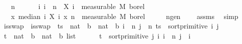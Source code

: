 \begin{isabellebody}
\ \ \ {\isachardoublequoteopen}n\ {\isasymge}\ {}{\isachardoublequoteclose}\ \isanewline
\ \ \ {\isachardoublequoteopen}{\isasymAnd}i{\isachardot}{\kern0pt}\ i\ {\isacharless}{\kern0pt}\ n\ {\isasymLongrightarrow}\ X\ i\ {\isasymin}\ measurable\ M\ borel{\isachardoublequoteclose}\isanewline
\ \ \ {\isachardoublequoteopen}{\isacharparenleft}{\kern0pt}{\isasymlambda}x{\isachardot}{\kern0pt}\ median\ {\isacharparenleft}{\kern0pt}{\isasymlambda}i{\isachardot}{\kern0pt}\ X\ i\ x{\isacharparenright}{\kern0pt}\ n{\isacharparenright}{\kern0pt}\ {\isasymin}\ measurable\ M\ borel{\isachardoublequoteclose}\isanewline
%
\isadelimproof
%
\endisadelimproof
%
\isatagproof
{}\isamarkupfalse%
\ {\isacharminus}{\kern0pt}\isanewline
\ \ \isamarkupfalse%
\ n{\isacharunderscore}{\kern0pt}ge{\isacharunderscore}{\kern0pt}{}{\isacharcolon}{\kern0pt}{\isachardoublequoteopen}n\ {\isachargreater}{\kern0pt}\ {}{\isachardoublequoteclose}\ \isamarkupfalse%
\ assms\ \isamarkupfalse%
\ simp\isanewline
\ \ \isamarkupfalse%
\ is{\isacharunderscore}{\kern0pt}swap\ \ {\isachardoublequoteopen}is{\isacharunderscore}{\kern0pt}swap\ {\isacharequal}{\kern0pt}\ {\isacharparenleft}{\kern0pt}{\isasymlambda}{\isacharparenleft}{\kern0pt}ts\ {\isacharcolon}{\kern0pt}{\isacharcolon}{\kern0pt}\ {\isacharparenleft}{\kern0pt}{\isacharparenleft}{\kern0pt}nat\ {\isasymRightarrow}\ {\isacharprime}{\kern0pt}b{\isacharparenright}{\kern0pt}\ {\isasymRightarrow}\ nat\ {\isasymRightarrow}\ {\isacharprime}{\kern0pt}b{\isacharparenright}{\kern0pt}{\isacharparenright}{\kern0pt}{\isachardot}{\kern0pt}\ {\isasymexists}i\ {\isacharless}{\kern0pt}\ n{\isachardot}{\kern0pt}\ {\isasymexists}j\ {\isacharless}{\kern0pt}\ n{\isachardot}{\kern0pt}\ ts\ {\isacharequal}{\kern0pt}\ sort{\isacharunderscore}{\kern0pt}primitive\ i\ j{\isacharparenright}{\kern0pt}{\isachardoublequoteclose}\isanewline
\ \ \isamarkupfalse%
\ t\ {\isacharcolon}{\kern0pt}{\isacharcolon}{\kern0pt}\ {\isachardoublequoteopen}{\isacharparenleft}{\kern0pt}{\isacharparenleft}{\kern0pt}nat\ {\isasymRightarrow}\ {\isacharprime}{\kern0pt}b{\isacharparenright}{\kern0pt}\ {\isasymRightarrow}\ nat\ {\isasymRightarrow}\ {\isacharprime}{\kern0pt}b{\isacharparenright}{\kern0pt}\ list{\isachardoublequoteclose}\ \isanewline
\ \ \ \ \ {\isachardoublequoteopen}t\ {\isacharequal}{\kern0pt}\ {\isacharbrackleft}{\kern0pt}sort{\isacharunderscore}{\kern0pt}primitive\ j\ i{\isachardot}{\kern0pt}\ i\ {\isacharless}{\kern0pt}{\isacharminus}{\kern0pt}\ {\isacharbrackleft}{\kern0pt}{}{\isachardot}{\kern0pt}{\isachardot}{\kern0pt}{\isacharless}{\kern0pt}n{\isacharbrackright}{\kern0pt}{\isacharcomma}{\kern0pt}\ j\ {\isacharless}{\kern0pt}{\isacharminus}{\kern0pt}\ {\isacharbrackleft}{\kern0pt}{}{\isachardot}{\kern0pt}{\isachardot}{\kern0pt}{\isacharless}{\kern0pt}i{\isacharbrackright}{\kern0pt}{\isacharbrackright}{\kern0pt}{\isachardoublequoteclose}\isanewline

\end{isabellebody}
